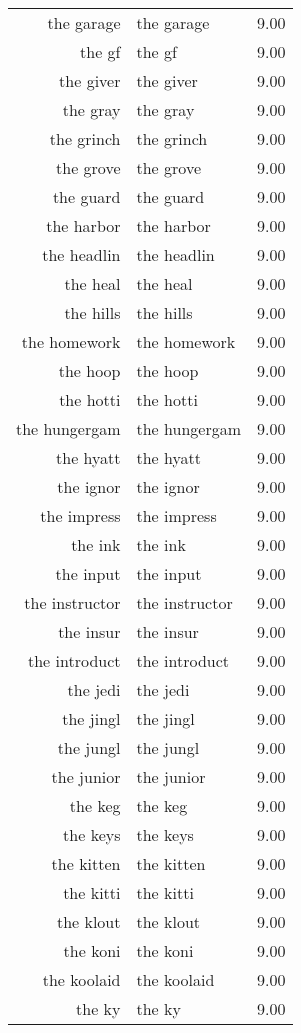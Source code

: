 \begin{table}[ht]
\begin{tabular}{rlr}
  the garage & the garage & 9.00 \\ 
  the gf & the gf & 9.00 \\ 
  the giver & the giver & 9.00 \\ 
  the gray & the gray & 9.00 \\ 
  the grinch & the grinch & 9.00 \\ 
  the grove & the grove & 9.00 \\ 
  the guard & the guard & 9.00 \\ 
  the harbor & the harbor & 9.00 \\ 
  the headlin & the headlin & 9.00 \\ 
  the heal & the heal & 9.00 \\ 
  the hills & the hills & 9.00 \\ 
  the homework & the homework & 9.00 \\ 
  the hoop & the hoop & 9.00 \\ 
  the hotti & the hotti & 9.00 \\ 
  the hungergam & the hungergam & 9.00 \\ 
  the hyatt & the hyatt & 9.00 \\ 
  the ignor & the ignor & 9.00 \\ 
  the impress & the impress & 9.00 \\ 
  the ink & the ink & 9.00 \\ 
  the input & the input & 9.00 \\ 
  the instructor & the instructor & 9.00 \\ 
  the insur & the insur & 9.00 \\ 
  the introduct & the introduct & 9.00 \\ 
  the jedi & the jedi & 9.00 \\ 
  the jingl & the jingl & 9.00 \\ 
  the jungl & the jungl & 9.00 \\ 
  the junior & the junior & 9.00 \\ 
  the keg & the keg & 9.00 \\ 
  the keys & the keys & 9.00 \\ 
  the kitten & the kitten & 9.00 \\ 
  the kitti & the kitti & 9.00 \\ 
  the klout & the klout & 9.00 \\ 
  the koni & the koni & 9.00 \\ 
  the koolaid & the koolaid & 9.00 \\ 
  the ky & the ky & 9.00 \\ 

\end{tabular}
\end{table}
